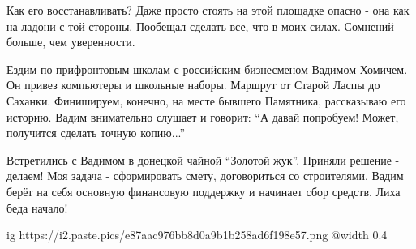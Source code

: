\begin{multicols}{2}

Как его восстанавливать? Даже просто стоять на этой площадке опасно - она как
на ладони с той стороны. Пообещал сделать все, что в моих силах. Сомнений
больше, чем уверенности.



Ездим по прифронтовым школам с российским бизнесменом Вадимом Хомичем. Он
привез компьютеры и школьные наборы. Маршрут от Старой Ласпы до Саханки.
Финишируем, конечно, на месте бывшего Памятника, рассказываю его историю. Вадим
внимательно слушает и говорит: \enquote{А давай попробуем! Может, получится сделать
точную копию...}



Встретились с Вадимом в донецкой чайной \enquote{Золотой жук}. Приняли решение -
делаем! Моя задача - сформировать смету, договориться со строителями. Вадим
берёт на себя основную финансовую поддержку и начинает сбор средств. Лиха беда
начало!

\ifcmt
	ig https://i2.paste.pics/e87aac976bb8d0a9b1b258ad6f198e57.png
	@width 0.4
\fi


\end{multicols} %
